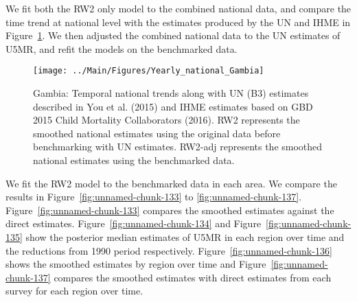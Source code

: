 \documentclass[12pt]{article}\usepackage[]{graphicx}\usepackage[]{color}
\newenvironment{knitrout}{}{} %
\begin{document}
We fit both the RW2 only model to the combined national data, and compare the time trend at national level with the estimates produced by the UN and IHME in Figure~\ref{fig:unnamed-chunk-132}. We then adjusted the combined national data to the UN estimates of U5MR, and refit the models on the benchmarked data. 

\begin{knitrout}
\color{fgcolor}\begin{figure}[bht]

{\centering \texttt{[image: ../Main/Figures/Yearly\_national\_Gambia]} 

}

\caption[Gambia]{Gambia: Temporal national trends along with UN (B3) estimates described in You et al. (2015) and IHME estimates based on GBD 2015 Child Mortality Collaborators (2016). RW2 represents the smoothed national estimates using the original data before benchmarking with UN estimates. RW2-adj represents the smoothed national estimates using the benchmarked data.}\label{fig:unnamed-chunk-132}
\end{figure}


\end{knitrout}
 

We fit the RW2 model to the benchmarked data in each area. 
We compare the results in Figure~\ref{fig:unnamed-chunk-133} to \ref{fig:unnamed-chunk-137}.
Figure~\ref{fig:unnamed-chunk-133} compares the smoothed estimates against the direct estimates. Figure~\ref{fig:unnamed-chunk-134} and Figure~\ref{fig:unnamed-chunk-135} show the posterior median estimates of U5MR in each region over time and the reductions from 1990 period respectively.
Figure~\ref{fig:unnamed-chunk-136} shows the smoothed estimates by region over time and Figure~\ref{fig:unnamed-chunk-137} compares the smoothed estimates with direct estimates from each survey for each region over time.




\end{document}
